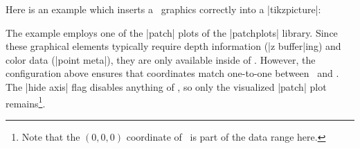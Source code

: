 Here is an example which inserts a \PGFPlots\ graphics correctly into a |tikzpicture|:
\begin{codeexample}[]
\end{codeexample}
\noindent The example employs one of the |patch| plots of the |patchplots| library. Since these graphical elements typically require depth information (|z buffer|ing) and color data (|point meta|), they are only available inside of \PGFPlots. However, the configuration above ensures that coordinates match one-to-one between \PGFPlots\ and \Tikz. The |hide axis| flag disables anything of \PGFPlots, so only the visualized |patch| plot remains\footnote{Note that the $(0,0,0)$ coordinate of \PGFPlots\ is part of the data range here.}.



